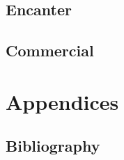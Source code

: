 \documentclass[reqno,12pt]{tufte-book}
\numberwithin{equation}{subsection}
\begin{document}
\chapter{Encanter}

\chapter{Commercial}




\clearpage
\part{Appendices}
\appendix
\begin{appendices}
\chapter{Bibliography}


\end{appendices}
\end{document}
